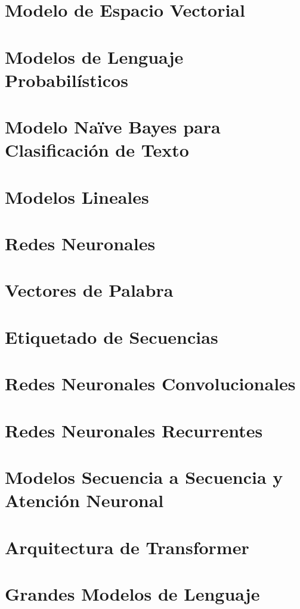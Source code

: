 \documentclass[11pt,fleqn]{book} %
\begin{document}
\chapter{Modelo de Espacio Vectorial}
\label{cap_ir}



\chapter{Modelos de Lenguaje Probabilísticos}
\label{cap_plm}



\chapter{Modelo Naïve Bayes para Clasificación de Texto}
\label{cap_nb}



\chapter{Modelos Lineales}
\label{cap_lineales}



\chapter{Redes Neuronales}
\label{cap_redes}


\chapter{Vectores de Palabra}
\label{cap_embeddings}


\chapter{Etiquetado de Secuencias}
\label{cap_etisec}




\chapter{Redes Neuronales Convolucionales}
\label{cap_cnn}



\chapter{Redes Neuronales Recurrentes}
\label{cap_rnn}




\chapter{Modelos Secuencia a Secuencia y Atención Neuronal}
\label{cap_sec}



\chapter{Arquitectura de Transformer}
\label{cap_trans}






\chapter{Grandes Modelos de Lenguaje}
\label{cap_llm}




\end{document}
